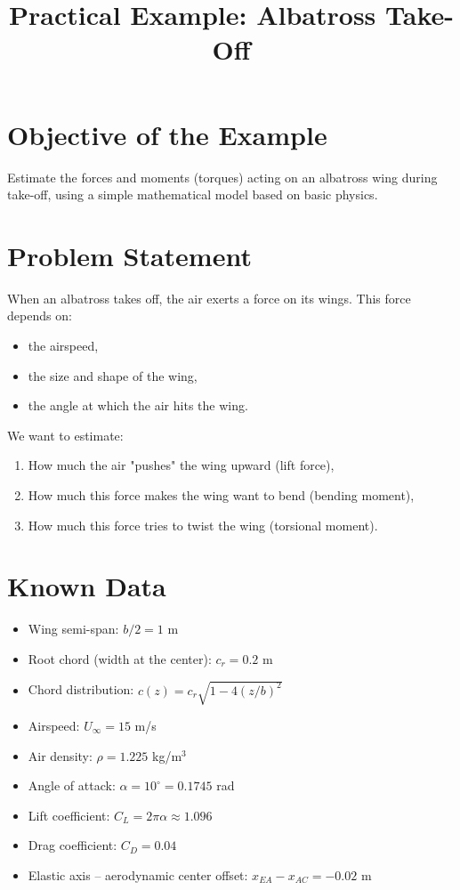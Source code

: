 \documentclass[12pt]{article}
\title{Practical Example: Albatross Take-Off}
\author{}
\date{}
\begin{document}
\maketitle

\section*{Objective of the Example}

Estimate the forces and moments (torques) acting on an albatross wing during take-off, using a simple mathematical model based on basic physics.

\section*{Problem Statement}

When an albatross takes off, the air exerts a force on its wings. This force depends on:
\begin{itemize}
    \item the airspeed,
    \item the size and shape of the wing,
    \item the angle at which the air hits the wing.
\end{itemize}

We want to estimate:
\begin{enumerate}
    \item How much the air "pushes" the wing upward (lift force),
    \item How much this force makes the wing want to bend (bending moment),
    \item How much this force tries to twist the wing (torsional moment).
\end{enumerate}

\section*{Known Data}

\begin{itemize}
    \item Wing semi-span: $b/2 = 1$ m
    \item Root chord (width at the center): $c_r = 0.2$ m
    \item Chord distribution: $c(z) = c_r \sqrt{1 - 4(z/b)^2}$
    \item Airspeed: $U_\infty = 15$ m/s
    \item Air density: $\rho = 1.225$ kg/m$^3$
    \item Angle of attack: $\alpha = 10^\circ = 0.1745$ rad
    \item Lift coefficient: $C_L = 2\pi \alpha \approx 1.096$
    \item Drag coefficient: $C_D = 0.04$
    \item Elastic axis – aerodynamic center offset: $x_{EA} - x_{AC} = -0.02$ m
\end{itemize}
\end{document}
